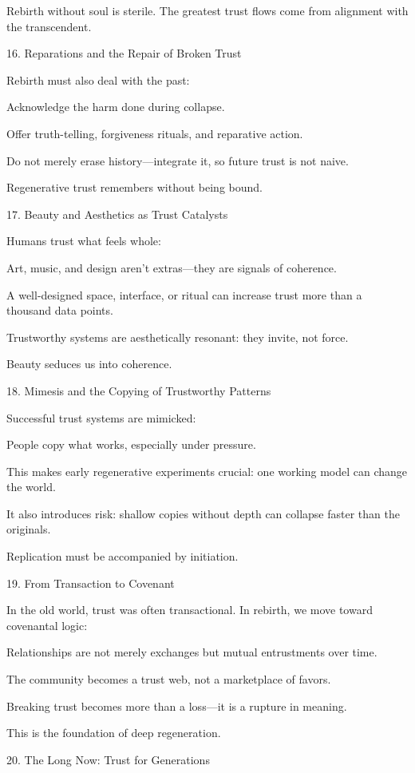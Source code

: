 \documentclass[11pt,oneside]{book}
\begin{document}
Rebirth without soul is sterile. The greatest trust flows come from alignment with the transcendent.

16. Reparations and the Repair of Broken Trust


Rebirth must also deal with the past:

    Acknowledge the harm done during collapse.

    Offer truth-telling, forgiveness rituals, and reparative action.

    Do not merely erase history—integrate it, so future trust is not naive.

Regenerative trust remembers without being bound.

17. Beauty and Aesthetics as Trust Catalysts


Humans trust what feels whole:

    Art, music, and design aren’t extras—they are signals of coherence.

    A well-designed space, interface, or ritual can increase trust more than a thousand data points.

    Trustworthy systems are aesthetically resonant: they invite, not force.

Beauty seduces us into coherence.

18. Mimesis and the Copying of Trustworthy Patterns


Successful trust systems are mimicked:

    People copy what works, especially under pressure.

    This makes early regenerative experiments crucial: one working model can change the world.

    It also introduces risk: shallow copies without depth can collapse faster than the originals.

Replication must be accompanied by initiation.

19. From Transaction to Covenant


In the old world, trust was often transactional. In rebirth, we move toward covenantal logic:

    Relationships are not merely exchanges but mutual entrustments over time.

    The community becomes a trust web, not a marketplace of favors.

    Breaking trust becomes more than a loss—it is a rupture in meaning.

This is the foundation of deep regeneration.

20. The Long Now: Trust for Generations
\end{document}
